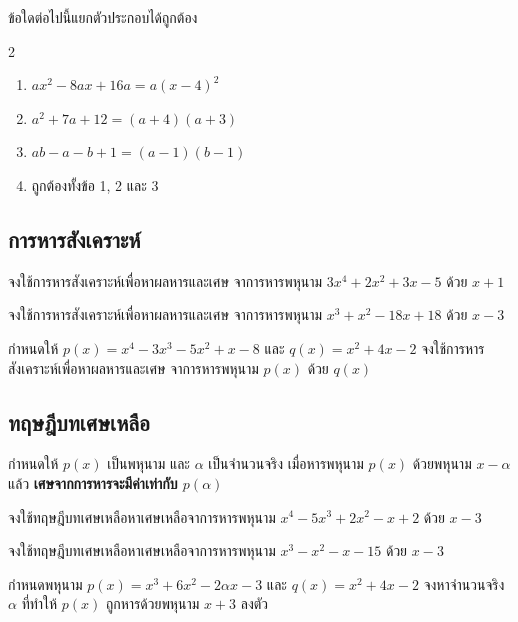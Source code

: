 \newpage
\begin{examplebox}
ข้อใดต่อไปนี้แยกตัวประกอบได้ถูกต้อง
\begin{multicols}{2}
\begin{enumerate}
\item $a x^2-8 a x+16 a=a(x-4)^2$
\item $a^2+7 a+12=(a+4)(a+3)$
\item $a b-a-b+1=(a-1)(b-1)$
\item ถูกต้องทั้งข้อ 1, 2 และ 3
\end{enumerate}
\end{multicols}
\end{examplebox}
\newpage
\subsection{การหารสังเคราะห์}
\begin{examplebox}
จงใช้การหารสังเคราะห์เพื่อหาผลหารและเศษ จาการหารพหุนาม $3x^4+2x^2+3x-5$ ด้วย $x+1$
\end{examplebox}
\vspace{10cm}
\begin{examplebox}
จงใช้การหารสังเคราะห์เพื่อหาผลหารและเศษ จาการหารพหุนาม $x^3+x^2-18x+18$ ด้วย $x-3$
\end{examplebox}

\newpage
\begin{examplebox}
กำหนดให้ $p(x)=x^4-3x^3-5x^2+x-8$ และ $q(x)=x^2+4x-2$ จงใช้การหารสังเคราะห์เพื่อหาผลหารและเศษ จาการหารพหุนาม $p(x)$ ด้วย $q(x)$
\end{examplebox}

\newpage
\subsection{ทฤษฎีบทเศษเหลือ}
\begin{theorembox}
กำหนดให้ $p(x)$ เป็นพหุนาม และ $\alpha$ เป็นจำนวนจริง  
เมื่อหารพหุนาม $p(x)$ ด้วยพหุนาม $x-\alpha$ แล้ว  
\textbf{เศษจากการหารจะมีค่าเท่ากับ $p(\alpha)$}
\end{theorembox}

\begin{examplebox}
จงใช้ทฤษฎีบทเศษเหลือหาเศษเหลือจาการหารพหุนาม $x^4-5x^3+2x^2-x+2$ ด้วย $x-3$
\end{examplebox}
\vspace{3cm}
\begin{examplebox}
จงใช้ทฤษฎีบทเศษเหลือหาเศษเหลือจาการหารพหุนาม $x^3-x^2-x-15$ ด้วย $x-3$
\end{examplebox}
\vspace{3cm}
\begin{examplebox}
กำหนดพหุนาม $p(x)=x^3+6x^2-2\alpha x-3$ และ $q(x)=x^2+4x-2$ จงหาจำนวนจริง $\alpha$ ที่ทำให้ $p(x)$ ถูกหารด้วยพหุนาม $x+3$ ลงตัว
\end{examplebox}

